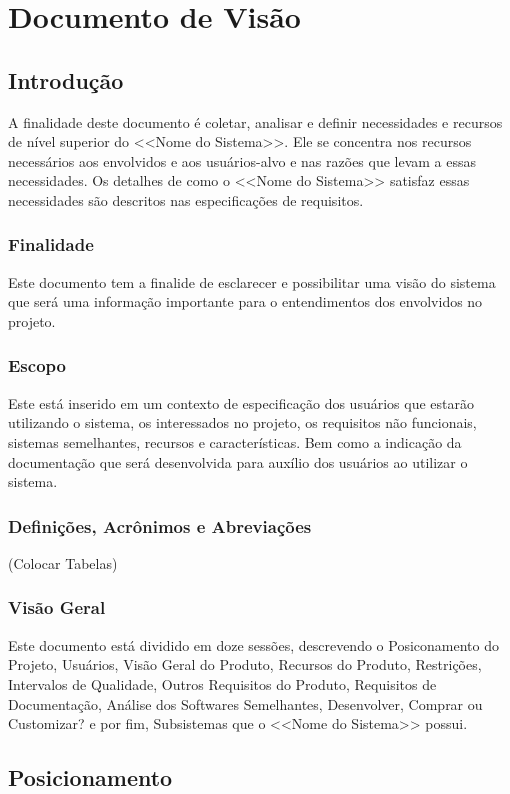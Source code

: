 \chapter[Documento de Visão]{Documento de Visão}

\section{Introdução}
A finalidade deste documento é coletar, analisar e definir necessidades e recursos de nível superior do <<Nome do Sistema>>. Ele se concentra nos recursos necessários aos envolvidos e aos usuários-alvo e nas razões que levam a essas necessidades. Os detalhes de como o <<Nome do Sistema>> satisfaz essas necessidades são descritos nas especificações de requisitos.

\subsection{Finalidade}
Este documento tem a finalide de  esclarecer e possibilitar uma visão do sistema que será uma informação importante para o entendimentos dos envolvidos no projeto.
\subsection{Escopo}
Este está inserido em um contexto de especificação dos usuários que estarão utilizando o sistema, os interessados no projeto, os requisitos não funcionais, sistemas semelhantes, recursos e características. Bem como a indicação da documentação que será desenvolvida para auxílio dos usuários ao utilizar o sistema.
\subsection{Definições, Acrônimos e Abreviações}
(Colocar Tabelas)
\subsection{Visão Geral}
Este documento está dividido em doze sessões, descrevendo o Posiconamento do Projeto, Usuários, Visão Geral do Produto, Recursos do Produto, Restrições, Intervalos de Qualidade, Outros Requisitos do Produto, Requisitos de Documentação, Análise dos Softwares Semelhantes, Desenvolver, Comprar ou Customizar? e por fim, Subsistemas que o <<Nome do Sistema>> possui.


\section{Posicionamento}

